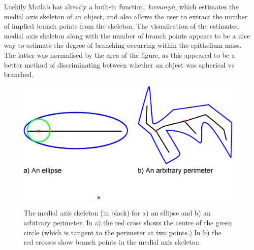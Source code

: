 \documentclass[pdftex,10pt,a4paper]{article}
\begin{document}
Luckily Matlab has already a built-in function, \emph{bwmorph}, which estimates the medial axis skeleton of an object, and also allows the user to extract the number of implied branch points from the skeleton. The visualisation of the estimated medial axis skeleton along with the number of branch points appears to be a nice way to estimate the degree of branching occurring within the epithelium mass. The latter was normalised by the area of the figure, as this appeared to be a better method of discriminating between whether an object was spherical vs branched.

\begin{figure}[t] 
\centering
\scalebox{0.5} 
{\includegraphics{medial.eps}}
\caption{The medial axis skeleton (in black) for a) an  ellipse and b) an arbitrary perimeter. In a) the red cross shows the centre of the green circle (which is tangent to the perimeter at two points.) In b) the red crosses show branch points in the medial axis skeleton.}\label{fig:medial}
\end{figure} 
\end{document}

